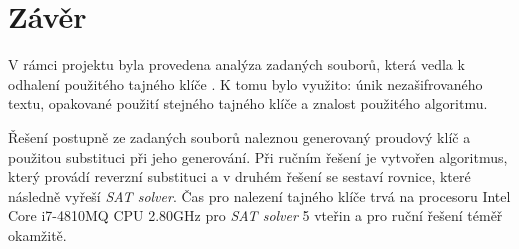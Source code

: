 \documentclass[11pt,a4paper]{article}
\begin{document}
\section{Závěr}

V rámci projektu byla provedena analýza zadaných souborů, která vedla k odhalení použitého tajného klíče . K tomu bylo využito: únik nezašifrovaného textu, opakované použití stejného tajného klíče a znalost použitého algoritmu. 

Řešení postupně ze zadaných souborů naleznou generovaný proudový klíč a použitou substituci při jeho generování. Při ručním řešení je vytvořen algoritmus, který provádí reverzní substituci a v druhém řešení se sestaví rovnice, které následně vyřeší \emph{SAT solver}. Čas pro nalezení tajného klíče trvá na procesoru Intel Core i7-4810MQ CPU 2.80GHz pro \emph{SAT solver} 5 vteřin a pro ruční řešení téměř okamžitě.
\end{document}
